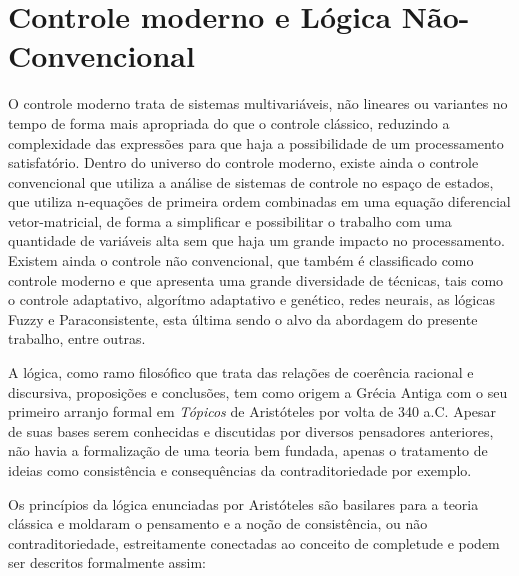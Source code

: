 








\section{Controle moderno e Lógica Não-Convencional}




O controle moderno trata de sistemas multivariáveis, 
não lineares ou variantes no tempo 
de forma mais apropriada do que o controle clássico, 
reduzindo a complexidade das expressões para que 
haja a possibilidade de um processamento satisfatório.
Dentro do universo do controle moderno, 
existe ainda o controle convencional que utiliza a 
análise de sistemas de controle no espaço de estados, 
que utiliza n-equações de primeira ordem 
combinadas em uma equação diferencial vetor-matricial, 
de forma a simplificar e possibilitar 
o trabalho com uma quantidade de variáveis alta 
sem que haja um grande impacto no processamento.  
\cite{Ogata} 
Existem ainda o controle não convencional, 
que também é classificado como controle moderno e que
apresenta uma grande diversidade de técnicas, 
tais como o controle adaptativo, 
algorítmo adaptativo e genético, 
redes neurais, 
as lógicas Fuzzy e Paraconsistente, 
esta última sendo o alvo da abordagem do presente trabalho, 
entre outras.


A lógica, como ramo filosófico que trata das 
relações de coerência racional e discursiva, proposições e conclusões, 
tem como origem a Grécia Antiga com o seu primeiro arranjo formal em 
\emph{Tópicos} de Aristóteles por volta de 340 a.C. 
Apesar de suas bases serem conhecidas e discutidas por 
diversos pensadores anteriores, 
não havia a formalização de uma teoria bem fundada, 
apenas o tratamento de ideias como 
consistência e consequências da contraditoriedade por exemplo. 

Os princípios da lógica enunciadas por Aristóteles são 
basilares para a teoria clássica e 
moldaram o pensamento e a noção de consistência, ou não contraditoriedade, 
estreitamente conectadas ao conceito de completude e 
podem ser descritos formalmente assim:


